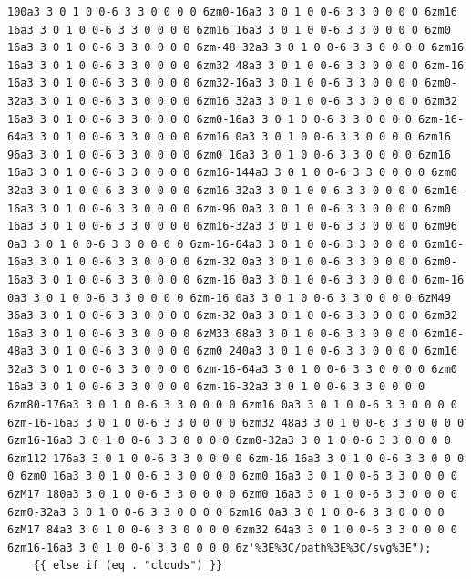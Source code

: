 \documentclass[11pt]{article}
\begin{document}
\begin{enumerate}
\begin{verbatim}
100a3 3 0 1 0 0-6 3 3 0 0 0 0 6zm0-16a3 3 0 1 0 0-6 3 3 0 0 0 0 6zm16 16a3 3 0 1 0 0-6 3 3 0 0 0 0 6zm16 16a3 3 0 1 0 0-6 3 3 0 0 0 0 6zm0 16a3 3 0 1 0 0-6 3 3 0 0 0 0 6zm-48 32a3 3 0 1 0 0-6 3 3 0 0 0 0 6zm16 16a3 3 0 1 0 0-6 3 3 0 0 0 0 6zm32 48a3 3 0 1 0 0-6 3 3 0 0 0 0 6zm-16 16a3 3 0 1 0 0-6 3 3 0 0 0 0 6zm32-16a3 3 0 1 0 0-6 3 3 0 0 0 0 6zm0-32a3 3 0 1 0 0-6 3 3 0 0 0 0 6zm16 32a3 3 0 1 0 0-6 3 3 0 0 0 0 6zm32 16a3 3 0 1 0 0-6 3 3 0 0 0 0 6zm0-16a3 3 0 1 0 0-6 3 3 0 0 0 0 6zm-16-64a3 3 0 1 0 0-6 3 3 0 0 0 0 6zm16 0a3 3 0 1 0 0-6 3 3 0 0 0 0 6zm16 96a3 3 0 1 0 0-6 3 3 0 0 0 0 6zm0 16a3 3 0 1 0 0-6 3 3 0 0 0 0 6zm16 16a3 3 0 1 0 0-6 3 3 0 0 0 0 6zm16-144a3 3 0 1 0 0-6 3 3 0 0 0 0 6zm0 32a3 3 0 1 0 0-6 3 3 0 0 0 0 6zm16-32a3 3 0 1 0 0-6 3 3 0 0 0 0 6zm16-16a3 3 0 1 0 0-6 3 3 0 0 0 0 6zm-96 0a3 3 0 1 0 0-6 3 3 0 0 0 0 6zm0 16a3 3 0 1 0 0-6 3 3 0 0 0 0 6zm16-32a3 3 0 1 0 0-6 3 3 0 0 0 0 6zm96 0a3 3 0 1 0 0-6 3 3 0 0 0 0 6zm-16-64a3 3 0 1 0 0-6 3 3 0 0 0 0 6zm16-16a3 3 0 1 0 0-6 3 3 0 0 0 0 6zm-32 0a3 3 0 1 0 0-6 3 3 0 0 0 0 6zm0-16a3 3 0 1 0 0-6 3 3 0 0 0 0 6zm-16 0a3 3 0 1 0 0-6 3 3 0 0 0 0 6zm-16 0a3 3 0 1 0 0-6 3 3 0 0 0 0 6zm-16 0a3 3 0 1 0 0-6 3 3 0 0 0 0 6zM49 36a3 3 0 1 0 0-6 3 3 0 0 0 0 6zm-32 0a3 3 0 1 0 0-6 3 3 0 0 0 0 6zm32 16a3 3 0 1 0 0-6 3 3 0 0 0 0 6zM33 68a3 3 0 1 0 0-6 3 3 0 0 0 0 6zm16-48a3 3 0 1 0 0-6 3 3 0 0 0 0 6zm0 240a3 3 0 1 0 0-6 3 3 0 0 0 0 6zm16 32a3 3 0 1 0 0-6 3 3 0 0 0 0 6zm-16-64a3 3 0 1 0 0-6 3 3 0 0 0 0 6zm0 16a3 3 0 1 0 0-6 3 3 0 0 0 0 6zm-16-32a3 3 0 1 0 0-6 3 3 0 0 0 0 6zm80-176a3 3 0 1 0 0-6 3 3 0 0 0 0 6zm16 0a3 3 0 1 0 0-6 3 3 0 0 0 0 6zm-16-16a3 3 0 1 0 0-6 3 3 0 0 0 0 6zm32 48a3 3 0 1 0 0-6 3 3 0 0 0 0 6zm16-16a3 3 0 1 0 0-6 3 3 0 0 0 0 6zm0-32a3 3 0 1 0 0-6 3 3 0 0 0 0 6zm112 176a3 3 0 1 0 0-6 3 3 0 0 0 0 6zm-16 16a3 3 0 1 0 0-6 3 3 0 0 0 0 6zm0 16a3 3 0 1 0 0-6 3 3 0 0 0 0 6zm0 16a3 3 0 1 0 0-6 3 3 0 0 0 0 6zM17 180a3 3 0 1 0 0-6 3 3 0 0 0 0 6zm0 16a3 3 0 1 0 0-6 3 3 0 0 0 0 6zm0-32a3 3 0 1 0 0-6 3 3 0 0 0 0 6zm16 0a3 3 0 1 0 0-6 3 3 0 0 0 0 6zM17 84a3 3 0 1 0 0-6 3 3 0 0 0 0 6zm32 64a3 3 0 1 0 0-6 3 3 0 0 0 0 6zm16-16a3 3 0 1 0 0-6 3 3 0 0 0 0 6z'%3E%3C/path%3E%3C/svg%3E");
    {{ else if (eq . "clouds") }}

\end{verbatim}
\end{enumerate}
\end{document}
